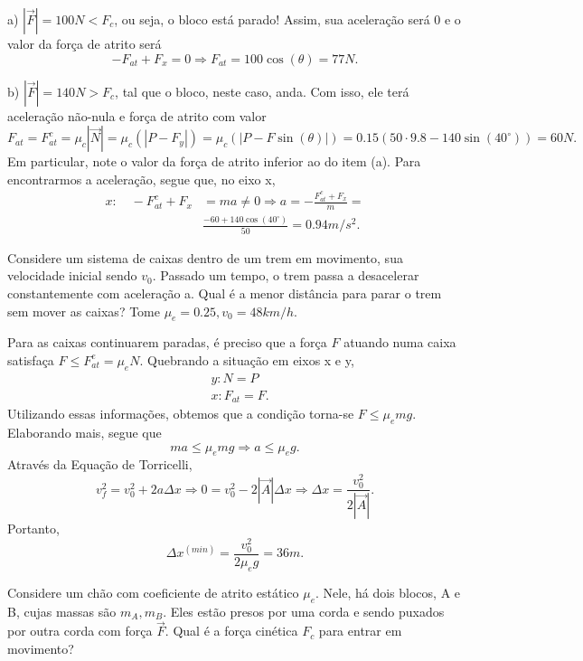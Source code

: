 \documentclass[physics_notes.tex]{subfiles}
\begin{document}
\begin{example}
	a) $|\vec{F}|= 100N < F_{c}$, ou seja, o bloco está parado! Assim, sua aceleração será 0 e o valor da força de atrito será
	$$
		-F_{at} + F_{x} = 0 \Rightarrow  F_{at} = 100\cos{(\theta )} = 77N.
	$$

	b) $|\vec{F}| = 140N > F_{c}$, tal que o bloco, neste caso, anda. Com isso, ele terá aceleração não-nula e força de atrito com valor
	$$
		F_{at} = F_{at}^{c} = \mu_{c}|\vec{N}| = \mu_{c}(|P-F_{y}|) = \mu_{c}(|P-F\sin{(\theta )}|) = 0.15(50 \cdot 9.8 - 140\sin{(40^{\circ})}) = 60N.
	$$
	Em particular, note o valor da força de atrito inferior ao do item (a). Para encontrarmos a aceleração, segue que, no eixo x,
	\begin{align*}
		x:\quad -F_{at}^{c} + F_{x} & = ma\neq0 \Rightarrow a = -\frac{F_{at}^{c}+F_{x}}{m} = \\
		                            & \frac{-60+140\cos{(40^{\circ})}}{50} = 0.94m/s^{2}.
	\end{align*}

	\begin{example}
		Considere um sistema de caixas dentro de um trem em movimento, sua velocidade inicial sendo $v_{0}$. Passado um tempo,
		o trem passa a desacelerar constantemente com aceleração a. Qual é a menor distância para parar o trem sem mover as caixas? Tome
		$\mu_{e}=0.25, v_{0}=48km/h.$

		Para as caixas continuarem paradas, é preciso que a força $F$ atuando numa caixa satisfaça $F\leq F_{at}^{e} = \mu_{e}N$.
		Quebrando a situação em eixos x e y,
		\begin{align*}
			 & y: N = P       \\
			 & x: F_{at} = F.
		\end{align*}
		Utilizando essas informações, obtemos que a condição torna-se $F\leq \mu_{e}mg.$ Elaborando mais, segue que
		$$
			ma\leq \mu_{e}mg \Rightarrow  a\leq \mu_{e}g.
		$$
		Através da Equação de Torricelli,
		$$
			v_{f}^{2} = v_{0}^{2} + 2a\Delta x \Rightarrow 0 = v_{0}^{2} - 2|\vec{A}|\Delta x \Rightarrow \Delta x = \frac{v_{0}^{2}}{2|\vec{A}|}.
		$$
		Portanto,
		$$
			\Delta x^{(min)} = \frac{v_{0}^{2}}{2\mu_{e}g} = 36m.
		$$
	\end{example}
	\begin{example}
		Considere um chão com coeficiente de atrito estático $\mu_{e}.$ Nele, há dois blocos, A e B, cujas massas são
		$m_{A}, m_{B}$. Eles estão presos por uma corda e sendo puxados por outra corda com força $\vec{F}.$ Qual é a força
		cinética $F_{c}$ para entrar em movimento?
		\begin{center}
			\begin{tikzpicture}[scale=1, transform shape]


\end{tikzpicture}
\end{center}
\end{example}
\end{example}
\end{document}
